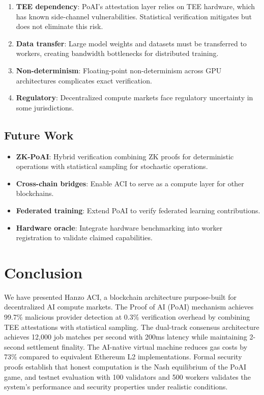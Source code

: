\documentclass[11pt,twocolumn]{article}
\begin{document}
\begin{enumerate}[leftmargin=1.4em]
    \item \textbf{TEE dependency}: PoAI's attestation layer relies on TEE hardware, which has known side-channel vulnerabilities. Statistical verification mitigates but does not eliminate this risk.
    \item \textbf{Data transfer}: Large model weights and datasets must be transferred to workers, creating bandwidth bottlenecks for distributed training.
    \item \textbf{Non-determinism}: Floating-point non-determinism across GPU architectures complicates exact verification.
    \item \textbf{Regulatory}: Decentralized compute markets face regulatory uncertainty in some jurisdictions.
\end{enumerate}

\subsection{Future Work}

\begin{itemize}[leftmargin=1.1em]
    \item \textbf{ZK-PoAI}: Hybrid verification combining ZK proofs for deterministic operations with statistical sampling for stochastic operations.
    \item \textbf{Cross-chain bridges}: Enable ACI to serve as a compute layer for other blockchains.
    \item \textbf{Federated training}: Extend PoAI to verify federated learning contributions.
    \item \textbf{Hardware oracle}: Integrate hardware benchmarking into worker registration to validate claimed capabilities.
\end{itemize}

\section{Conclusion}
\label{sec:conclusion}

We have presented Hanzo ACI, a blockchain architecture purpose-built for decentralized AI compute markets. The Proof of AI (PoAI) mechanism achieves 99.7\% malicious provider detection at 0.3\% verification overhead by combining TEE attestations with statistical sampling. The dual-track consensus architecture achieves 12,000 job matches per second with 200ms latency while maintaining 2-second settlement finality. The AI-native virtual machine reduces gas costs by 73\% compared to equivalent Ethereum L2 implementations. Formal security proofs establish that honest computation is the Nash equilibrium of the PoAI game, and testnet evaluation with 100 validators and 500 workers validates the system's performance and security properties under realistic conditions.
\end{document}
